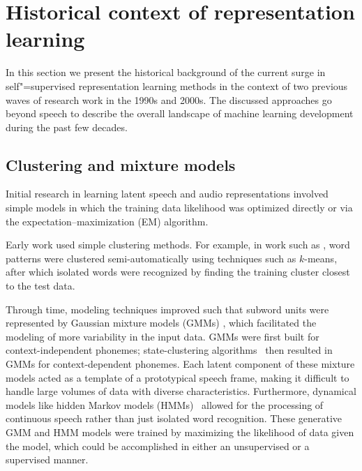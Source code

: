 
\section{Historical context of representation learning}

\label{sec:thirdwave}

In this section we present the historical background of the current surge in
self"=supervised representation learning methods in the context of two previous
waves of research work in the 1990s and 2000s. The discussed approaches go
beyond speech to describe the overall landscape of machine learning development during the
past few decades.

\subsection{Clustering and mixture models}

Initial research in learning latent speech and audio representations involved
simple models in which the training data likelihood was optimized directly
or via the expectation--maximization (EM) algorithm.

Early work used simple clustering methods. For example, in work such
as \parencite{rabiner_considerations_1979,wilpon_modified_1985}, word patterns were clustered
semi-automatically using techniques such as $k$-means, after which isolated words
were recognized by finding the training cluster closest to 
  the test data.

Through time, modeling techniques improved such that subword units were
represented by Gaussian mixture models (GMMs) \parencite{gauvain_maximum_1994}, which facilitated
the modeling of more variability in the input data. GMMs were first built for
context-independent phonemes; state-clustering 
algorithms~\parencite{young_state_1994} then resulted in GMMs for context-dependent phonemes. 
Each latent component of these mixture models acted as a template of a
prototypical speech frame, 
making it difficult to handle 
large volumes of data with diverse characteristics. 
Furthermore, dynamical models like hidden Markov models (HMMs)~\parencite{bell_adaptation_2021}
allowed for the processing of continuous speech rather than just isolated word
recognition. These generative GMM and HMM models were trained by maximizing the
likelihood of data given the model, which could be accomplished in either an
unsupervised or a supervised manner.


